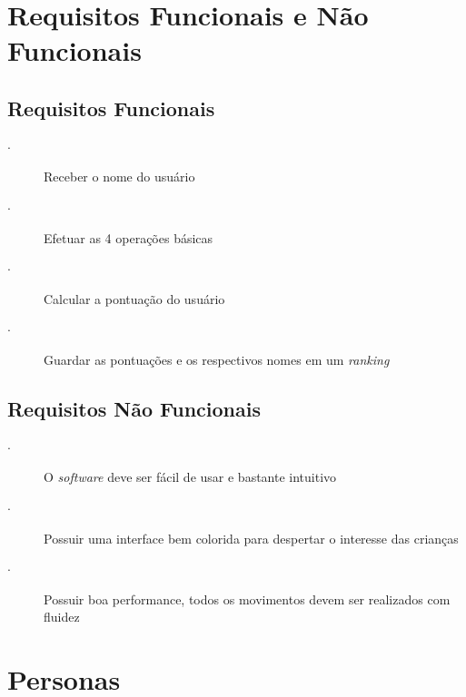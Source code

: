 \documentclass[
    12pt,               %
    openany,          	%
    twoside,            %
    a4paper,            %
    brazil              %
    ]{abntex2}
\begin{document}
\chapter{Requisitos Funcionais e Não Funcionais}

\section{Requisitos Funcionais}

\begin{description}
\item[$\cdot$] Receber o nome do usuário
\item[$\cdot$] Efetuar as 4 operações básicas
\item[$\cdot$] Calcular a pontuação do usuário
\item[$\cdot$] Guardar as pontuações e os respectivos nomes em um \textit{ranking}
\end{description}

\section{Requisitos Não Funcionais}

\begin{description}
\item[$\cdot$] O \textit{software} deve ser fácil de usar e bastante intuitivo
\item[$\cdot$] Possuir uma interface bem colorida para despertar o interesse das crianças
\item[$\cdot$] Possuir boa performance, todos os movimentos devem ser realizados com fluidez
\end{description}


\chapter{Personas}
\end{document}
